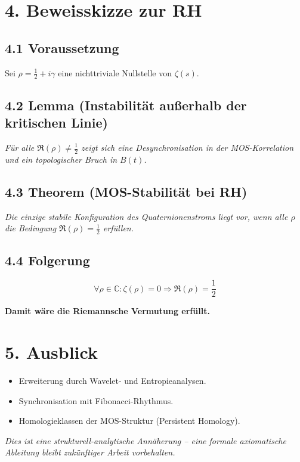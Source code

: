 \documentclass[12pt]{article}
\begin{document}
\section*{4. Beweisskizze zur RH}

\subsection*{4.1 Voraussetzung}

Sei $\rho = \frac{1}{2} + i\gamma$ eine nichttriviale Nullstelle von $\zeta(s)$.

\subsection*{4.2 Lemma (Instabilität außerhalb der kritischen Linie)}
\textit{Für alle $\Re(\rho) \neq \frac{1}{2}$ zeigt sich eine Desynchronisation in der MOS-Korrelation und ein topologischer Bruch in $B(t)$.}

\subsection*{4.3 Theorem (MOS-Stabilität bei RH)}
\textit{Die einzige stabile Konfiguration des Quaternionenstroms liegt vor, wenn alle $\rho$ die Bedingung $\Re(\rho) = \frac{1}{2}$ erfüllen.}

\subsection*{4.4 Folgerung}
\[
\forall \rho \in \mathbb{C}: \zeta(\rho) = 0 \Rightarrow \Re(\rho) = \frac{1}{2}
\]

\textbf{Damit wäre die Riemannsche Vermutung erfüllt.}

\section*{5. Ausblick}

\begin{itemize}
  \item Erweiterung durch Wavelet- und Entropieanalysen.
  \item Synchronisation mit Fibonacci-Rhythmus.
  \item Homologieklassen der MOS-Struktur (Persistent Homology).
\end{itemize}

\bigskip
\textit{Dies ist eine strukturell-analytische Annäherung – eine formale axiomatische Ableitung bleibt zukünftiger Arbeit vorbehalten.}
\end{document}
